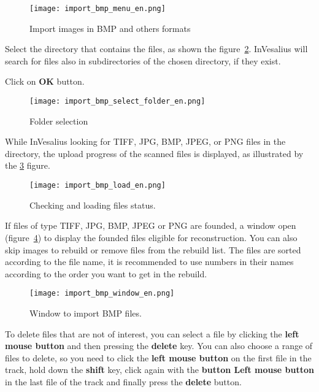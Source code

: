 \begin{figure}[!htb]
\centering
\texttt{[image: import\_bmp\_menu\_en.png]}
\caption{Import images in BMP and others formats}
\label{fig:import_bmp_menu_pt}
\end{figure}

Select the directory that contains the files, as shown the figure~\ref{fig:import_bmp_select_folder}. InVesalius will search for files also in subdirectories of the chosen directory, if they exist. 

Click on \textbf{OK} button.

\begin{figure}[!htb]
\centering
\texttt{[image: import\_bmp\_select\_folder\_en.png]}
\caption{Folder selection}
\label{fig:import_bmp_select_folder}
\end{figure}

While InVesalius looking for TIFF, JPG, BMP, JPEG, or PNG files in the directory, the upload progress of the scanned files is displayed, as illustrated by the \ref{fig:import_bmp_load_pt} figure.

\begin{figure}[!htb]
\centering
\texttt{[image: import\_bmp\_load\_en.png]}
\caption{Checking and loading files status.}
\label{fig:import_bmp_load_pt}
\end{figure}

If files of type TIFF, JPG, BMP, JPEG or PNG are founded, a window open (figure~\ref{fig:import_bmp_window_pt}) to display the founded files eligible for reconstruction. You can also skip images to rebuild or remove files from the rebuild list. The files are sorted according to the file name, it is recommended to use numbers in their names according to the order you want to get in the rebuild.

\begin{figure}[!htb]
\centering
\texttt{[image: import\_bmp\_window\_en.png]}
\caption{Window to import BMP files.}
\label{fig:import_bmp_window_pt}
\end{figure}
 
To delete files that are not of interest, you can select a file by clicking the \textbf{left mouse button} and then pressing the \textbf{delete} key. You can also choose a range of files to delete, so you need to click the \textbf{left mouse button} on the first file in the track, hold down the \textbf{shift} key, click again with the \textbf{button Left mouse button} in the last file of the track and finally press the \textbf{delete} button.
 

